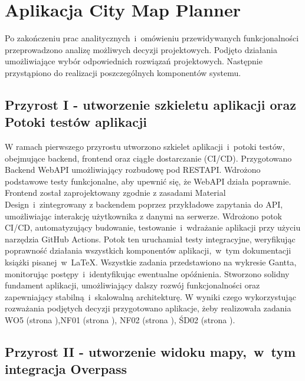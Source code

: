 \section{Aplikacja City Map Planner}
\label{sec:aplikacja}

Po zakończeniu prac analitycznych~i~omówieniu przewidywanych funkcjonalności przeprowadzono analizę możliwych decyzji projektowych. 
Podjęto działania umożliwiające wybór odpowiednich rozwiązań projektowych. 
Następnie przystąpiono do realizacji poszczególnych komponentów systemu.

\subsection{Przyrost I - utworzenie szkieletu aplikacji oraz Potoki testów aplikacji}
\label{sec:przyrost1}

W ramach pierwszego przyrostu utworzono szkielet aplikacji~i~potoki testów, obejmujące backend, frontend oraz ciągłe dostarczanie (CI/CD). \newline
\indent Przygotowano Backend WebAPI umożliwiający rozbudowę pod RESTAPI. Wdrożono podstawowe testy funkcjonalne, aby upewnić się, że WebAPI działa poprawnie.\newline
\indent Frontend został zaprojektowany zgodnie z zasadami Material Design~i~zintegrowany z backendem poprzez przykładowe zapytania do API, umożliwiając interakcję użytkownika z danymi na serwerze. \newline
\indent Wdrożono potok CI/CD, automatyzujący budowanie, testowanie~i~wdrażanie aplikacji przy użyciu narzędzia GitHub Actions. Potok ten uruchamiał testy integracyjne, weryfikując poprawność działania wszystkich komponentów aplikacji,~w~tym dokumentacji książki pisanej~w~\LaTeX. \newline
\indent Wszystkie zadania przedstawiono na wykresie Gantta, monitorując postępy~i~identyfikując ewentualne opóźnienia. Stworzono solidny fundament aplikacji, umożliwiający dalszy rozwój funkcjonalności oraz zapewniający stabilną~i~skalowalną architekturę. \newline
W wyniki czego wykorzystując rozważania podjętych decyzji przygotowano aplikacje, żeby realizowała zadania WO5 (strona \pageref{tab:requirements:general5}),NF01 (strona \pageref{tab:requirements:nonfunc1}), NF02 (strona \pageref{tab:requirements:nonfunc2}), ŚD02 (strona \pageref{tab:requirements:envfunc2}).

\subsection{Przyrost II - utworzenie widoku mapy,~w~tym integracja  Overpass}
    \label{sec:przyrost2}

